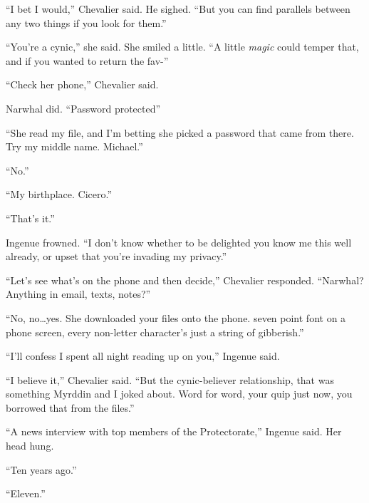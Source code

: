 ``I bet I would,'' Chevalier said.  He sighed.  ``But you can find parallels between any two things if you look for them.''



``You're a cynic,'' she said.  She smiled a little.  ``A little \emph{magic} could temper that, and if you wanted to return the fav-''



``Check her phone,'' Chevalier said.



Narwhal did.  ``Password protected''



``She read my file, and I'm betting she picked a password that came from there.  Try my middle name.  Michael.''



``No.''



``My birthplace.  Cicero.''



``That's it.''



Ingenue frowned.  ``I don't know whether to be delighted you know me this well already, or upset that you're invading my privacy.''



``Let's see what's on the phone and then decide,'' Chevalier responded.  ``Narwhal?  Anything in email, texts, notes?''



``No, no\ldots yes.  She downloaded your files onto the phone.  seven point font on a phone screen, every non-letter character's just a string of gibberish.''



``I'll confess I spent all night reading up on you,'' Ingenue said.



``I believe it,'' Chevalier said.  ``But the cynic-believer relationship, that was something Myrddin and I joked about.  Word for word, your quip just now, you borrowed that from the files.''



``A news interview with top members of the Protectorate,'' Ingenue said.  Her head hung.



``Ten years ago.''



``Eleven.''



